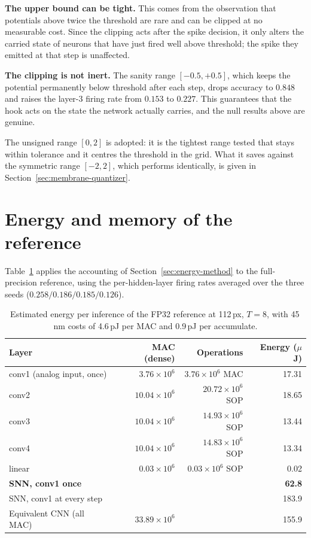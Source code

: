 \textbf{The upper bound can be tight.} This comes from the
observation that potentials above twice the threshold are
rare and can be clipped at no measurable cost. Since the clipping acts after the
spike decision, it only alters the carried state of neurons that have just fired
well above threshold; the spike they emitted at that step is unaffected.

\textbf{The clipping is not inert.} The sanity range $[-0.5, +0.5]$, which
keeps the potential permanently below threshold after each step, drops accuracy
to $0.848$ and raises the layer-3 firing rate from $0.153$ to $0.227$. This
guarantees that the hook acts on the state the network actually carries, and the null results
above are genuine.

The unsigned range $[0, 2]$ is adopted: it is the tightest range tested that
stays within tolerance and it centres the threshold in the grid. What it saves
against the symmetric range $[-2, 2]$, which performs identically, is given in
Section~\ref{sec:membrane-quantizer}.

\section{Energy and memory of the reference}
\label{sec:energy-fp32}

Table~\ref{tab:energy-fp32} applies the accounting of
Section~\ref{sec:energy-method} to the full-precision reference, using the
per-hidden-layer firing rates averaged over the three seeds
($0.258 / 0.186 / 0.185 / 0.126$).

\begin{table}[htbp]
\centering
\begin{tabular}{lrrr}
\toprule
Layer & MAC (dense) & Operations & Energy ($\mu$J) \\
\midrule
conv1 (analog input, once) & $3.76 \times 10^{6}$ & $3.76 \times 10^{6}$ MAC & 17.31 \\
conv2 & $10.04 \times 10^{6}$ & $20.72 \times 10^{6}$ SOP & 18.65 \\
conv3 & $10.04 \times 10^{6}$ & $14.93 \times 10^{6}$ SOP & 13.44 \\
conv4 & $10.04 \times 10^{6}$ & $14.83 \times 10^{6}$ SOP & 13.34 \\
linear & $0.03 \times 10^{6}$ & $0.03 \times 10^{6}$ SOP & 0.02 \\
\midrule
\textbf{SNN, conv1 once} & & & \textbf{62.8} \\
SNN, conv1 at every step & & & 183.9 \\
Equivalent CNN (all MAC) & $33.89 \times 10^{6}$ & & 155.9 \\
\bottomrule
\end{tabular}
\caption{Estimated energy per inference of the FP32 reference at 112\,px,
$T = 8$, with 45\,nm costs of 4.6\,pJ per MAC and 0.9\,pJ per accumulate.}
\label{tab:energy-fp32}
\end{table}

